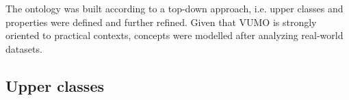 \documentclass[]{interact}
\theoremstyle{plain}%
\theoremstyle{definition}
\theoremstyle{remark}
\theoremstyle{definition}
\begin{document}
%


The ontology was built according to a top-down approach, i.e. upper classes and properties were defined and further refined. Given that VUMO is strongly oriented to practical contexts, concepts were modelled after analyzing real-world datasets.


\subsection{Upper classes}
\label{sec:upperclasses}

\end{document}
